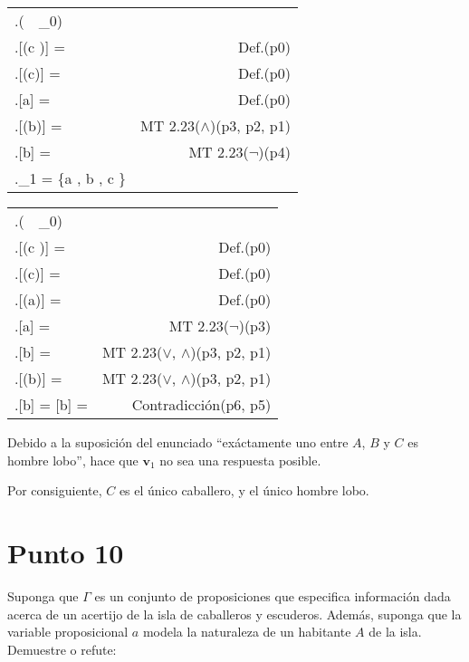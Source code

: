 \documentclass{article}
\newcommand{\q}[1]{``#1''}
\newcommand{\val}[2]{\mathbf{#1}[#2]}
\newlength{\logicv}
\newenvironment{subproofill}[1][0]{
  \begin{tcolorbox}[demo, title = ]
    \vspace*{-#1\logicv}
}{
  \end{tcolorbox}
  \vspace*{-.5cm}
}
\newenvironment{subproof}[2][0]{
  \begin{tcolorbox}[demo, title = #2, colframe = black]
  \vspace*{#1\logicv}
  \begin{logic}
}{
  \end{logic}
  \end{tcolorbox}
}
\newenvironment{logic}{
    \setlength{\extrarowheight}{3pt}
    \setcounter{row}{-1}
    \begin{center}
    \begin{NiceTabular}{>{\stepcounter{row}\therow.\hspace*{5pt}} L r }
}{
    \end{NiceTabular}
    \end{center}
}
\begin{document}
\begin{subproofill}
  \begin{subproof}{Con $\Gamma_1$}
    (\exists {}\, \vert\,   \Gamma_0)\\
    \val{v}{(c \equiv \phi)} =  & Def.(p0)\\
    \val{v}{(\neg c)} =  & Def.(p0)\\
    \val{v}{a} =  & Def.(p0)\\
    \val{v}{(\neg b)} =  & MT 2.23($\land$)(p3, p2, p1)\\
    \val{v}{b} =  & MT 2.23($\neg$)(p4)\\
    _1 = \{a \mapsto {}, b \mapsto {}, c \mapsto {}\}
  \end{subproof}
\end{subproofill}

\begin{subproofill}
  \begin{subproof}{Con $\Gamma_2$}
    (\exists {}\, \vert\,   \Gamma_0)\\
    \val{v}{(c \equiv \phi)} =  & Def.(p0)\\
    \val{v}{(\neg c)} =  & Def.(p0)\\
    \val{v}{(\neg a)} =  & Def.(p0)\\
    \val{v}{a} =  & MT 2.23($\neg$)(p3)\\
    \val{v}{b} =  & MT 2.23($\lor$, $\land$)(p3, p2, p1)\\
    \val{v}{(\neg b)} =  & MT 2.23($\lor$, $\land$)(p3, p2, p1)\\
    \val{v}{b} =   \val{v}{b} =  & Contradicción(p6, p5)
  \end{subproof}
\end{subproofill}
\begin{subproofill}
  Debido a la suposición del enunciado \q{exáctamente uno entre $A$, $B$ y $C$ es hombre lobo}, hace que $\mathbf{v}_1$ no sea una respuesta posible.

  Por consiguiente, $C$ es el único caballero, y el único hombre lobo.
\end{subproofill}

\section{Punto 10}
Suponga que $\Gamma$ es un conjunto de proposiciones que especifica información dada acerca de un acertijo de
la isla de caballeros y escuderos. Además, suponga que la variable proposicional $a$ modela la naturaleza
de un habitante $A$ de la isla. Demuestre o refute:
\end{document}

